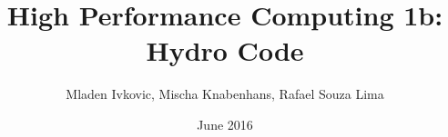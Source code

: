 \documentclass[8pt]{beamer}
\title{High Performance Computing 1b: Hydro Code}
\author{
	Mladen Ivkovic, Mischa Knabenhans, Rafael Souza Lima
}
\date{June 2016}
\begin{document}
% 
% 
% 
% 
% 


\begin{frame}{}
	\titlepage
\end{frame}
\small
\end{document}
